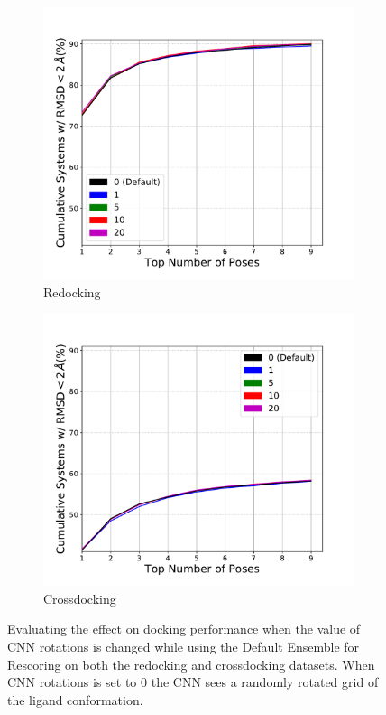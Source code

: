 \documentclass[journal=jcisd8,manuscript=article]{achemso}
\begin{document}
\begin{figure}    
        \begin{subfigure}[b]{0.48\textwidth}    
		\centering
		\includegraphics[width=\textwidth]{figures/redocking/sweep_cnnrot_line.pdf}
		\caption{Redocking}
		\label{fig:CNNRotRedock}
        \end{subfigure}    
        \begin{subfigure}[b]{0.48\textwidth}    
		\centering
		\includegraphics[width=\textwidth]{figures/crossdocking/sweep_cnnrot_line.pdf}
		\caption{Crossdocking}
		\label{fig:CNNRotCrossdock}
        \end{subfigure}    
	\caption{Evaluating the effect on docking performance when the value of CNN rotations is changed while using the Default Ensemble for Rescoring on both the redocking and crossdocking datasets. When CNN rotations is set to 0 the CNN sees a randomly rotated grid of the ligand conformation.}
	\label{fig:CNNRot}
\end{figure}  
\end{document}
